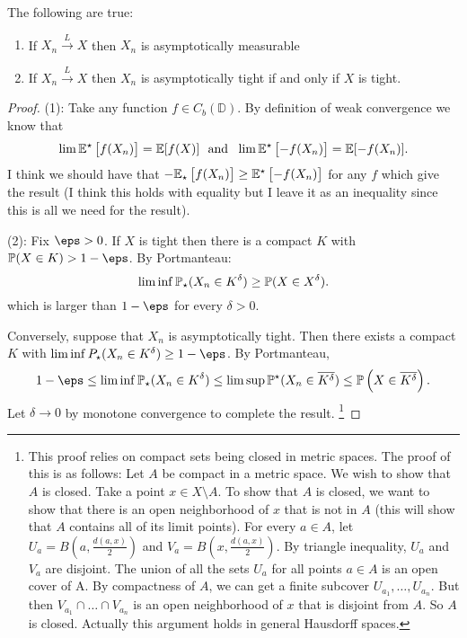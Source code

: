 \begin{lemma}
	\label{lemma:vdv1.3.8}
	The following are true:
	\begin{enumerate}
		\item If \(X_n \overset{L}{\to} X\) then \(X_n\) is asymptotically measurable
		\item If \(X_n \overset{L}{\to} X\) then \(X_n\) is asymptotically tight if and only if \(X\) is tight.
	\end{enumerate}
\end{lemma}
\begin{proof}
	(1): Take any function \(f \in C_b(\mathbb{D})\). By definition of weak convergence we know that 
	 \[
		 \lim\E^\star\left[f(X_n)\right] =\E[f(X)]\andbox \lim\E^\star\left[-f(X_n)\right]= \E[-f(X_n)]
	.\] 
	I think we should have that \(-\E_\star\left[f(X_n)\right] \geq \E^\star\left[-f(X_n)\right]\) for any \(f\) which give the result (I think this holds with equality but I leave it as an inequality since this is all we need for the result).

	(2): Fix \(\eps > 0\). If  \(X\) is tight then there is a compact  \(K\) with  \(\P(X \in K) > 1-\eps\). By Portmanteau:
	 \[
		 \lim\inf \P_\star(X_n \in K^\delta) \geq \P(X\in X^\delta)
	.\] 
	which is larger than \(1-\eps\) for every  \(\delta > 0\). 

	Conversely, suppose that \(X_n\) is asymptotically tight. Then there exists a compact \(K\) with  \(\lim\inf P_\star(X_n\in K^\delta) \geq 1-\eps\). By Portmanteau,
	\[
		1-\eps \leq \lim\inf \P_\star(X_n \in K^\delta) \leq \lim\sup \P^\star(X_n\in \overline{K^\delta}) \leq  \P\left(X\in \overline{K^\delta}\right)
	.\] Let \(\delta\to 0\) by monotone convergence to complete the result.
	\footnote{This proof relies on compact sets being closed in metric spaces. The proof of this is as follows: 
	Let  \(A\) be compact in a metric space. We wish to show that \(A\) is closed. Take a point \(x \in X\setminus A\). 
	To show that \(A\) is closed, we want to show that there is an open neighborhood of  \(x\) that is not in  \(A\) (this will show that \(A\) contains all of its limit points). For every  \(a \in A\), let  \(U_a = B\left(a, \frac{d(a,x)}{2} \right)\) and \(V_a = B\left(x,\frac{d(a,x)}{2} \right)\). By triangle inequality, \(U_a\) and  \(V_a\) are disjoint.
	The union of all the sets \(U_a\) for all points  \(a \in A\) is an open cover of A. By compactness of  \(A\), we can get a finite subcover \(U_{a_1},\dots,U_{a_n}\). But then \(V_{a_1}\cap \dots\cap V_{a_n}\) is an open neighborhood of \(x\)  that is disjoint from  \(A\). So \(A\) is closed. Actually this argument holds in general Hausdorff spaces.}
\end{proof}
